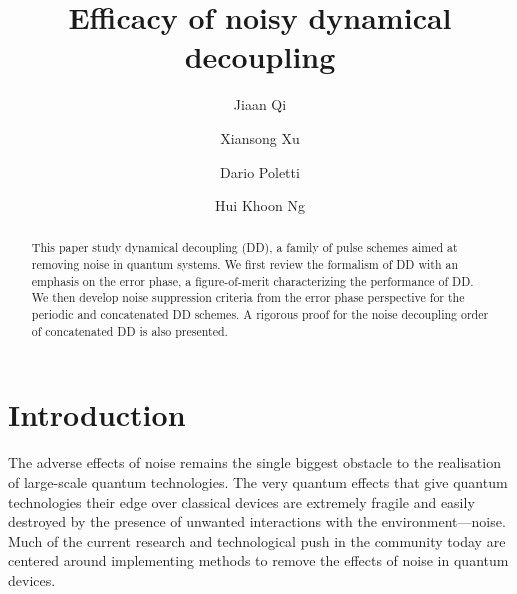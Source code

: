 \documentclass[twocolumn,pra,superscriptaddress]{revtex4-2}
\begin{document}
\title{Efficacy of noisy dynamical decoupling}
\author{Jiaan Qi}

\author{Xiansong Xu}
\author{Dario Poletti}
\author{Hui Khoon Ng}


\begin{abstract}
This paper study dynamical decoupling (DD), a family of pulse schemes aimed at removing noise in quantum systems. We first review the formalism of DD with an emphasis on the error phase, a figure-of-merit characterizing the performance of DD. We then develop noise suppression criteria from the error phase perspective for the periodic and concatenated DD schemes. A rigorous proof for the noise decoupling order of  concatenated DD is also presented.
\end{abstract}

\maketitle




\section{Introduction}
The adverse effects of noise remains the single biggest obstacle to the realisation of large-scale quantum technologies. The very quantum effects that give quantum technologies their edge over classical devices are extremely fragile and easily destroyed by the presence of unwanted interactions with the environment—noise. Much of the current research and technological push in the community today are centered around implementing methods to remove the effects of noise in quantum devices.
\end{document}
